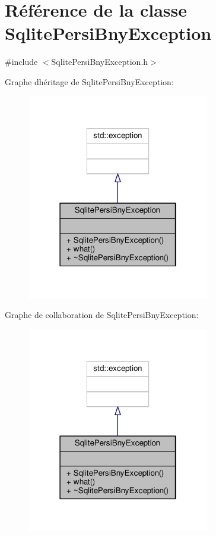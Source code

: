 \hypertarget{classSqlitePersiBnyException}{}\section{Référence de la classe Sqlite\+Persi\+Bny\+Exception}
\label{classSqlitePersiBnyException}


{\ttfamily \#include $<$Sqlite\+Persi\+Bny\+Exception.\+h$>$}



Graphe d\textquotesingle{}héritage de Sqlite\+Persi\+Bny\+Exception\+:
\nopagebreak
\begin{figure}[H]
\begin{center}
\leavevmode
\includegraphics[width=226pt]{classSqlitePersiBnyException__inherit__graph}
\end{center}
\end{figure}


Graphe de collaboration de Sqlite\+Persi\+Bny\+Exception\+:
\nopagebreak
\begin{figure}[H]
\begin{center}
\leavevmode
\includegraphics[width=226pt]{classSqlitePersiBnyException__coll__graph}
\end{center}
\end{figure}
